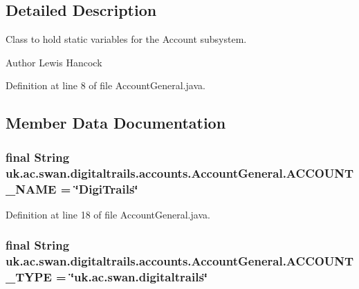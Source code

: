 \subsection{Detailed Description}
Class to hold static variables for the Account subsystem. 

\begin{DoxyAuthor}{Author}
Lewis Hancock 
\end{DoxyAuthor}


Definition at line 8 of file Account\+General.\+java.



\subsection{Member Data Documentation}
\hypertarget{classuk_1_1ac_1_1swan_1_1digitaltrails_1_1accounts_1_1_account_general_a4a73125c4d02277098caa3048e956830}{
\subsubsection[{A\+C\+C\+O\+U\+N\+T\+\_\+\+N\+A\+M\+E}]{\setlength{\rightskip}{0pt plus 5cm}final String uk.\+ac.\+swan.\+digitaltrails.\+accounts.\+Account\+General.\+A\+C\+C\+O\+U\+N\+T\+\_\+\+N\+A\+M\+E = \char`\"{}Digi\+Trails\char`\"{}\hspace{0.3cm}{\ttfamily [static]}}}\label{classuk_1_1ac_1_1swan_1_1digitaltrails_1_1accounts_1_1_account_general_a4a73125c4d02277098caa3048e956830}


Definition at line 18 of file Account\+General.\+java.

\hypertarget{classuk_1_1ac_1_1swan_1_1digitaltrails_1_1accounts_1_1_account_general_ad61076ae0093d3190a34939cae8aba50}{
\subsubsection[{A\+C\+C\+O\+U\+N\+T\+\_\+\+T\+Y\+P\+E}]{\setlength{\rightskip}{0pt plus 5cm}final String uk.\+ac.\+swan.\+digitaltrails.\+accounts.\+Account\+General.\+A\+C\+C\+O\+U\+N\+T\+\_\+\+T\+Y\+P\+E = \char`\"{}uk.\+ac.\+swan.\+digitaltrails\char`\"{}\hspace{0.3cm}{\ttfamily [static]}}}\label{classuk_1_1ac_1_1swan_1_1digitaltrails_1_1accounts_1_1_account_general_ad61076ae0093d3190a34939cae8aba50}


